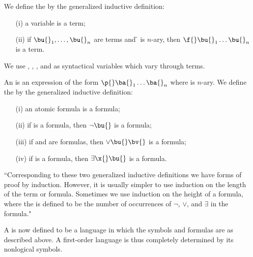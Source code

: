 \begin{shaded*}

We define the  by the generalized inductive definition:
    \begin{enumerate}
        \item[(i)] a variable is a term;
        \item[(ii)] if $\bu{}_1, \dots, \bu{}_n$ are terms and \f{} is $n$-ary, then $\f{}\bu{}_1 \dots \bu{}_n$ is a term.
    \end{enumerate}
\end{shaded*}

We use \ba{}, \bb{}, \bc{}, and \bd{} as syntactical variables which vary through terms.

\begin{shaded*}
    An  is an expression of the form $\p{}\ba{}_1\dots \ba{}_n$ where \p{} is $n$-ary.
    We define the  by the generalized inductive definition:
    \begin{enumerate}
        \item[(i)] an atomic formula is a formula;
        \item[(ii)] if \bu{} is a formula, then $\neg \bu{}$ is a formula;
        \item[(iii)] if \bu{} and \bv{} are formulas, then $\vee \bu{}\bv{}$ is a formula;
        \item[(iv)] if \bu{} is a formula, then $\exists \x{} \bu{}$ is a formula.
    \end{enumerate}
\end{shaded*}

\begin{remark}
    ``Corresponding to these two generalized inductive definitions we have forms of proof by induction.
    However, it is usually simpler to use induction on the length of the term or formula.
    Sometimes we use induction on the height of a formula, where the  is defined to be the number of occurrences of $\neg$, $\vee$, and $\exists$ in the formula."
\end{remark}

A  is now defined to be a language in which the symbols and formulas are as described above.
A first-order language is thus completely determined by its nonlogical symbols.


